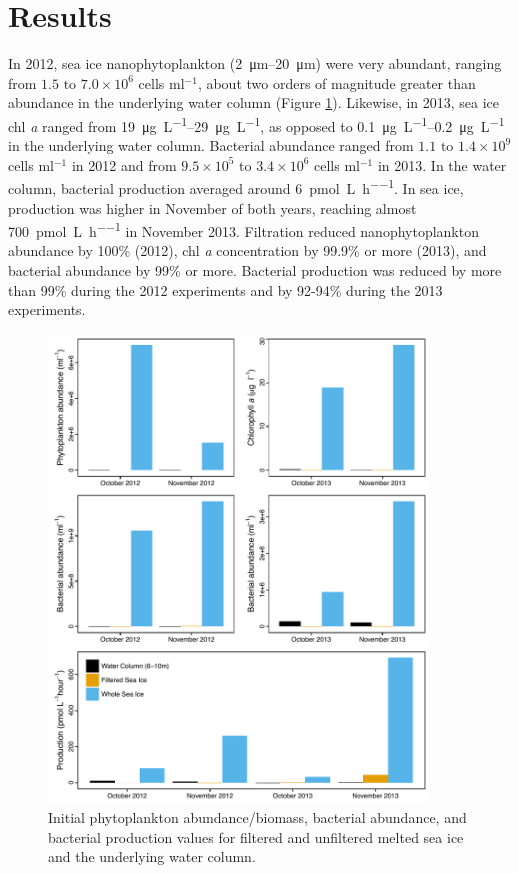\section{Results} 

In 2012, sea ice nanophytoplankton (\SIrange{2}{20}{\micro\meter}) were very abundant, ranging from $1.5 \text{ to } 7.0 \times 10^{6}$ cells ml$^{-1}$, about two orders of magnitude greater than abundance in the underlying water column (Figure \ref{fig:ch5:exp2012}). Likewise, in 2013, sea ice chl \emph{a} ranged from \SIrange{19}{29}{\micro\gram\per\liter}, as opposed to \SIrange{0.1}{0.2}{\micro\gram\per\liter} in the underlying water column. Bacterial abundance ranged from $1.1 \text{ to } 1.4 \times 10^{9}$ cells ml$^{-1}$ in 2012 and from $9.5 \times 10^{5}$ to $3.4 \times 10^{6}$ cells ml$^{-1}$ in 2013. In the water column, bacterial production averaged around \SI{6}{\pico\mole \per\liter \per\hour}. In sea ice, production was higher in November of both years, reaching almost \SI{700}{\pico\mole \per\liter \per\hour} in November 2013. Filtration reduced nanophytoplankton abundance by 100\% (2012), chl \emph{a} concentration by 99.9\% or more (2013), and bacterial abundance by 99\% or more. Bacterial production was reduced by more than 99\% during the 2012 experiments and by 92-94\% during the 2013 experiments.


\begin{figure}[htbp] 
\centering 
\includegraphics[width=0.9\textwidth]{Chapter_6_SeaIce/Figures/initial_values}
\caption{Initial phytoplankton abundance/biomass, bacterial abundance, and bacterial production values for filtered and unfiltered melted sea ice and the underlying water column.} 
\label{fig:ch5:exp2012} 
\end{figure}


